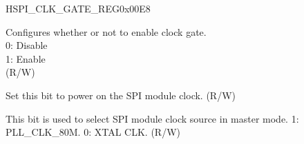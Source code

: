 \begin{register}{H}{SPI\_CLK\_GATE\_REG}{0x00E8}\label{regdesc:SPICLKGATEREG}
%
%
%
%
\regnewline%
\begin{regdesc}\begin{reglist}
\label{fielddesc:SPICLKEN}\item [SPI\_CLK\_EN] Configures whether or not to enable clock gate.\\
0: Disable\\
1: Enable\\
 (R/W)
\label{fielddesc:SPIMSTCLKACTIVE}\item [SPI\_MST\_CLK\_ACTIVE] Set this bit to power on the SPI module clock. (R/W)
\label{fielddesc:SPIMSTCLKSEL}\item [SPI\_MST\_CLK\_SEL] This bit is used to select SPI module clock source in master mode. 1: PLL\_CLK\_80M. 0: XTAL CLK. (R/W)
\end{reglist}\end{regdesc}
\end{register}


